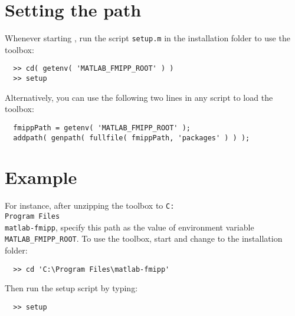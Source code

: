 \section{Setting the \matlab path}

Whenever starting \matlab, run the script \texttt{setup.m} in the installation folder to use the \fmipp \matlab toolbox:
\begin{verbatim}
  >> cd( getenv( 'MATLAB_FMIPP_ROOT' ) )
  >> setup
\end{verbatim}
Alternatively, you can use the following two lines in any \matlab script to load the toolbox:
\begin{verbatim}
  fmippPath = getenv( 'MATLAB_FMIPP_ROOT' );
  addpath( genpath( fullfile( fmippPath, 'packages' ) ) );
\end{verbatim}


\section{Example}

For instance, after unzipping the toolbox to \texttt{C:\\Program~Files\\matlab-fmipp}, specify this path as the value of environment variable \texttt{MATLAB\_FMIPP\_ROOT}.
To use the toolbox, start \matlab and change to the installation folder:
\begin{verbatim}
  >> cd 'C:\Program Files\matlab-fmipp'
\end{verbatim}
Then run the setup script by typing:
\begin{verbatim}
  >> setup
\end{verbatim}
